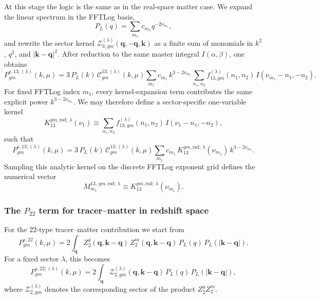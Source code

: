 \documentclass[a4paper,11pt]{article}
\newcommand{\vk}{\bm{k}}
\newcommand{\vq}{\bm{q}}
\newcommand{\<}{\langle}
\renewcommand{\>}{\rangle}
\begin{document}
At this stage the logic is the same as in the real-space matter case. We expand the linear spectrum in the FFTLog basis,
\begin{equation}
P_L(q)=\sum_{m_1} c_{m_1} q^{-2\nu_{m_1}},
\end{equation}
and rewrite the sector kernel \(\mathcal Z_{3,gm}^{(\lambda)}(\vq,-\vq,\vk)\) as a finite sum of monomials in \(k^2\), \(q^2\), and \(|\vk-\vq|^2\). After reduction to the same master integral \(I(\alpha,\beta)\), one obtains
\begin{equation}
P_{gm}^{s,13;(\lambda)}(k,\mu)
=
3\,P_L(k)\,\mathcal C_{gm}^{13;(\lambda)}(k,\mu)
\sum_{m_1} c_{m_1}\,k^{3-2\nu_{m_1}}
\sum_{n_1,n_2}
f_{13,gm}^{(\lambda)}(n_1,n_2)\,
I(\nu_{m_1}-n_1,-n_2).
\label{eq:P13_gm_after_master}
\end{equation}
For fixed FFTLog index \(m_1\), every kernel-expansion term contributes the same explicit power \(k^{3-2\nu_{m_1}}\). We may therefore define a sector-specific one-variable kernel
\begin{equation}
K_{13}^{gm,\mathrm{rsd};\,\lambda}(\nu_1)
\equiv
\sum_{n_1,n_2}
f_{13,gm}^{(\lambda)}(n_1,n_2)\,
I(\nu_1-n_1,-n_2),
\label{eq:K13_gm_lambda}
\end{equation}
such that
\begin{equation}
P_{gm}^{s,13;(\lambda)}(k,\mu)
=
3\,P_L(k)\,\mathcal C_{gm}^{13;(\lambda)}(k,\mu)
\sum_{m_1}
c_{m_1}\,
K_{13}^{gm,\mathrm{rsd};\,\lambda}(\nu_{m_1})\,
k^{3-2\nu_{m_1}}.
\label{eq:P13_gm_kernel_form}
\end{equation}
Sampling this analytic kernel on the discrete FFTLog exponent grid defines the numerical vector
\begin{equation}
M_{m_1}^{13,\,gm,\mathrm{rsd};\,\lambda}
\equiv
K_{13}^{gm,\mathrm{rsd};\,\lambda}(\nu_{m_1}).
\end{equation}

\subsubsection{The \(P_{22}\) term for tracer--matter in redshift space}

For the \(22\)-type tracer--matter contribution we start from
\begin{equation}
P_{gm}^{s,22}(k,\mu)
=
2\int_{\vq}
Z_2^g(\vq,\vk-\vq)\,
Z_2^m(\vq,\vk-\vq)\,
P_L(q)\,P_L(|\vk-\vq|).
\label{eq:P22_gm_start}
\end{equation}
For a fixed sector \(\lambda\), this becomes
\begin{equation}
P_{gm}^{s,22;(\lambda)}(k,\mu)
=
2\int_{\vq}
\mathcal Z_{2,gm}^{(\lambda)}(\vq,\vk-\vq)\,
P_L(q)\,P_L(|\vk-\vq|),
\end{equation}
where \(\mathcal Z_{2,gm}^{(\lambda)}\) denotes the corresponding sector of the product \(Z_2^g Z_2^m\).
\end{document}
